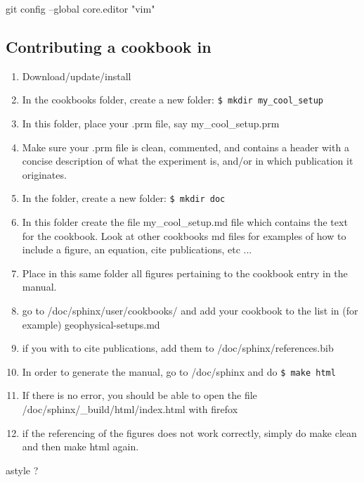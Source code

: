 git config --global core.editor "vim"




\newpage

\subsection{Contributing a cookbook in \aspect}

\begin{enumerate}
\item Download/update/install \aspect 
\item In the cookbooks folder, create a new folder: \verb'$ mkdir my_cool_setup'
\item In this folder, place your .prm file, say my\_cool\_setup.prm
\item Make sure your .prm file is clean, commented, and contains a header with a concise
description of what the experiment is, and/or in which publication it originates.
\item In the folder, create a new folder:  \verb'$ mkdir doc'
\item In this folder create the file my\_cool\_setup.md file which contains the 
text for the cookbook. Look at other cookbooks md files for examples of how 
to include a figure, an equation, cite publications, etc ...
\item Place in this same folder all figures pertaining 
to the cookbook entry in the manual. 
\item go to /doc/sphinx/user/cookbooks/ and add your cookbook to the list in 
(for example) geophysical-setups.md
\item if you with to cite publications, add them to /doc/sphinx/references.bib
\item In order to generate the manual, go to /doc/sphinx and do \verb"$ make html"
\item If there is no error, you should be able to open the file /doc/sphinx/\_build/html/index.html
with firefox
\item if the referencing of the figures does not work correctly, simply do 
make clean and then make html again.
\end{enumerate}

astyle ?



\newpage
